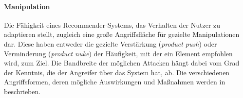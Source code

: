 \paragraph{Manipulation} Die Fähigkeit eines Recommender-Systems, das Verhalten der Nutzer zu adaptieren stellt, zugleich eine große Angriffsfläche für gezielte Manipulationen dar. Diese haben entweder die gezielte Verstärkung (\textit{product push}) oder Verminderung (\textit{product nuke}) der Häufigkeit, mit der ein Element empfohlen wird, zum Ziel. Die Bandbreite der möglichen Attacken hängt dabei vom Grad der Kenntnis, die der Angreifer über das System hat, ab. Die verschiedenen Angriffsformen, deren mögliche Auswirkungen und Maßnahmen werden in \citep{hb_25} beschrieben. %

